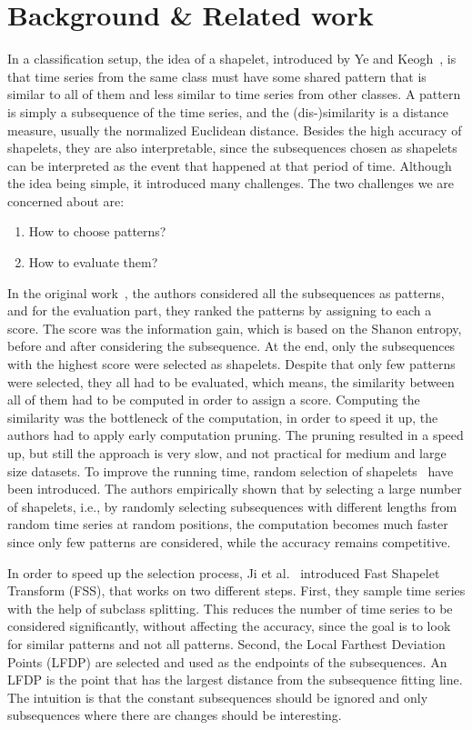\documentclass[sigconf, nonacm]{acmart}
\begin{document}
\section{Background \& Related work}
In a classification setup, the idea of a shapelet, introduced by Ye and
Keogh~\cite{keogh_shapelet}, is that time series from the same class must have
some shared pattern that is similar to all of them and less similar to time
series from other classes. A pattern is simply a subsequence of the time series,
and the (dis-)similarity is a distance measure, usually the normalized Euclidean
distance. Besides the high accuracy of shapelets, they are also interpretable,
since the subsequences chosen as shapelets can be interpreted as the event that
happened at that period of time.
Although the idea being simple, it introduced many challenges. The two
challenges we are concerned about are:
\begin{enumerate}
	\item How to choose patterns?
	\item How to evaluate them?
\end{enumerate}
In the original work~\cite{keogh_shapelet}, the authors considered all the
subsequences as patterns, and for the evaluation part, they ranked the patterns
by assigning to each a score. The score was the information gain, which is based
on the Shanon entropy, before and after considering the subsequence. At the end,
only the subsequences with the highest score were selected as shapelets.
Despite that only few patterns were selected, they all had to be evaluated,
which means, the similarity between all of them had to be computed in order to
assign a score. Computing the similarity was the bottleneck of the computation,
in order to speed it up, the authors had to apply early computation pruning.
The pruning resulted in a speed up, but still the approach is very slow,
and not practical for medium and large size datasets. To improve the running
time, random selection of shapelets~\cite{random_shapelets} have been
introduced. The authors empirically shown that by selecting a large number of
shapelets, i.e., by randomly selecting subsequences with different lengths from
random time series at random positions, the computation becomes much faster
since only few patterns are considered, while the accuracy remains competitive.

In order to speed up the selection process, Ji et al.~\cite{fss} introduced
Fast Shapelet Transform (FSS), that works on two different steps. First, they
sample  time series with the help of subclass splitting. This reduces the
number of time series to be considered significantly, without affecting the
accuracy, since the goal is to look for similar patterns and not all patterns.
Second, the Local Farthest Deviation Points (LFDP) are selected and used as the
endpoints of the subsequences. An LFDP is the point that has the largest
distance from the subsequence fitting line. The intuition is that the constant
subsequences should be ignored and only subsequences where there are changes
should be interesting.
\end{document}
